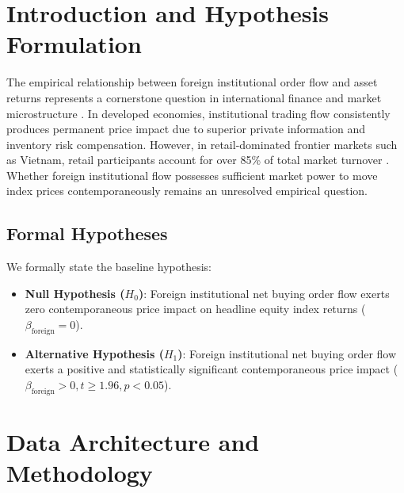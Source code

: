 \documentclass{article}
\begin{document}
\section{Introduction and Hypothesis Formulation}
\label{sec:intro}

The empirical relationship between foreign institutional order flow and asset returns represents a cornerstone question in international finance and market microstructure \citep{kyle1985continuous, froot2001portfolio}. In developed economies, institutional trading flow consistently produces permanent price impact due to superior private information and inventory risk compensation. However, in retail-dominated frontier markets such as Vietnam, retail participants account for over 85\% of total market turnover \citep{choe1999do}. Whether foreign institutional flow possesses sufficient market power to move index prices contemporaneously remains an unresolved empirical question.

\subsection{Formal Hypotheses}
We formally state the baseline hypothesis:
\begin{itemize}
    \item \textbf{Null Hypothesis ($H_0$)}: Foreign institutional net buying order flow exerts zero contemporaneous price impact on headline equity index returns ($\beta_{\text{foreign}} = 0$).
    \item \textbf{Alternative Hypothesis ($H_1$)}: Foreign institutional net buying order flow exerts a positive and statistically significant contemporaneous price impact ($\beta_{\text{foreign}} > 0, t \ge 1.96, p < 0.05$).
\end{itemize}

\section{Data Architecture and Methodology}
\label{sec:methods}
\end{document}
